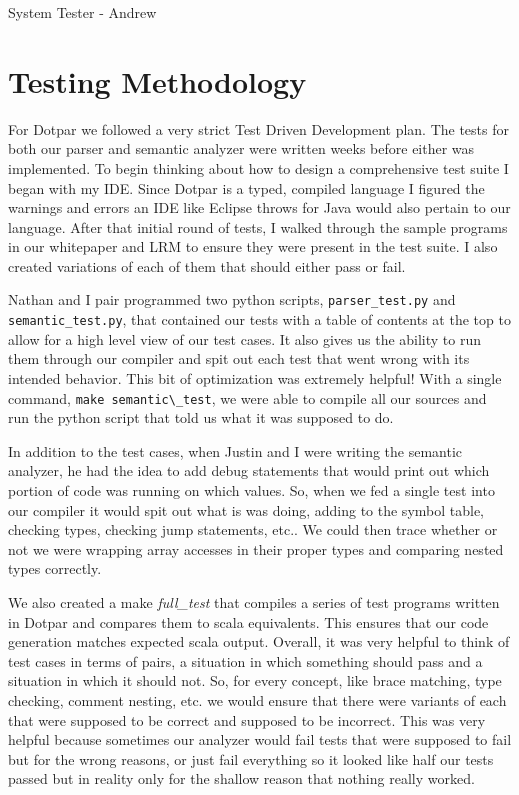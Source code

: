System Tester - Andrew

\section{Testing Methodology}
For Dotpar we followed a very strict Test Driven Development plan. The
tests for both our parser and semantic analyzer were written weeks
before either was implemented. To begin thinking
about how to design a comprehensive test suite I began with my
IDE. Since Dotpar is a typed, compiled language I figured the warnings
and errors an IDE like Eclipse throws for Java would also pertain to
our language. After that initial round of tests, I walked through the
sample programs in our whitepaper and LRM to ensure they were
present in the test suite. I also created variations of each of
them that should either pass or fail.

Nathan and I pair programmed two python scripts,
\verb=parser_test.py= and \verb=semantic_test.py=, that contained our
tests with a table of contents at the top to allow for a high level
view of our test cases. It also gives us the ability to run them through our compiler and spit out each test that went wrong with its intended
behavior. This bit of optimization was extremely helpful! With a
single command, \verb=make semantic\_test=, we were able to compile all our
sources and run the python script that told us what it was supposed to
do.

In addition to the test cases, when Justin and I were writing the
semantic analyzer, he had the idea to add debug statements that
would print out which portion of code was running on which values. So,
when we fed a single test into our compiler it would spit out what is
was doing, adding to the symbol table, checking types, checking jump
statements, etc.. We could then trace whether or not we were
wrapping array accesses in their proper types and comparing nested
types correctly.

We also created a make \emph{full\_test} that compiles a series of
test programs written in Dotpar and compares them to scala
equivalents. This ensures that our code generation matches expected
scala output.  Overall, it was very helpful to think of test cases in
terms of pairs, a situation in which something should pass and a
situation in which it should not. So, for every concept, like brace
matching, type checking, comment nesting, etc. we would ensure that
there were variants of each that were supposed to be correct and
supposed to be incorrect. This was very helpful because sometimes our
analyzer would fail tests that were supposed to fail but for the wrong
reasons, or just fail everything so it looked like half our tests
passed but in reality only for the shallow reason that nothing really
worked.

